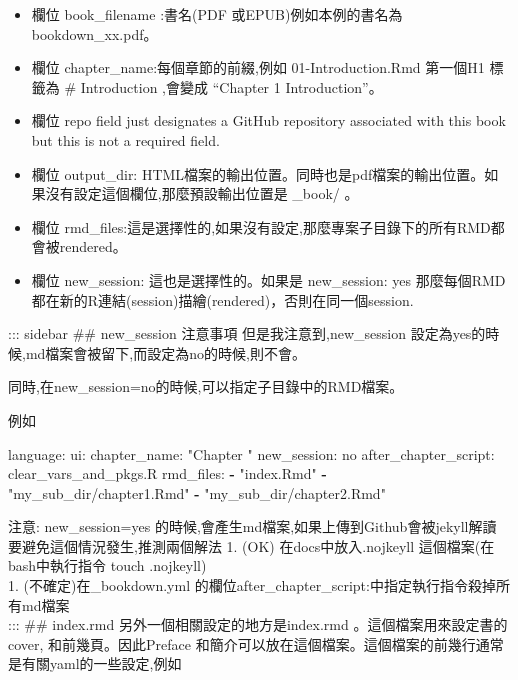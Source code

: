 \documentclass[]{book}
\newenvironment{Shaded}{\begin{snugshade}}{\end{snugshade}}
\newcommand{\KeywordTok}[1]{\textcolor[rgb]{0.13,0.29,0.53}{\textbf{#1}}}
\newcommand{\StringTok}[1]{\textcolor[rgb]{0.31,0.60,0.02}{#1}}
\newcommand{\FunctionTok}[1]{\textcolor[rgb]{0.00,0.00,0.00}{#1}}
\newcommand{\AttributeTok}[1]{\textcolor[rgb]{0.77,0.63,0.00}{#1}}
\providecommand{\tightlist}{%
  \setlength{\itemsep}{0pt}\setlength{\parskip}{0pt}}
\theoremstyle{definition}
\theoremstyle{definition}
\theoremstyle{definition}
\theoremstyle{remark}
\begin{document}
\begin{itemize}
\tightlist
\item
  欄位 book\_filename :書名(PDF
  或EPUB)例如本例的書名為bookdown\_xx.pdf。\\
\item
  欄位 chapter\_name:每個章節的前綴,例如 01-Introduction.Rmd 第一個H1
  標籤為 \# Introduction ,會變成 ``Chapter 1 Introduction''。\\
\item
  欄位 repo field just designates a GitHub repository associated with
  this book but this is not a required field.\\
\item
  欄位 output\_dir:
  HTML檔案的輸出位置。同時也是pdf檔案的輸出位置。如果沒有設定這個欄位,那麼預設輸出位置是
  \_book/ 。\\
\item
  欄位
  rmd\_files:這是選擇性的,如果沒有設定,那麼專案子目錄下的所有RMD都會被rendered。\\
\item
  欄位 new\_session: 這也是選擇性的。如果是 new\_session: yes
  那麼每個RMD都在新的R連結(session)描繪(rendered)，否則在同一個session.
\end{itemize}

::: sidebar \#\# new\_session 注意事項 但是我注意到,new\_session
設定為yes的時候,md檔案會被留下,而設定為no的時候,則不會。

同時,在new\_session=no的時候,可以指定子目錄中的RMD檔案。

例如

\begin{Shaded}
\begin{Highlighting}[]
\FunctionTok{language:}
  \FunctionTok{ui:}
    \FunctionTok{chapter_name:}\AttributeTok{ }\StringTok{"Chapter "}
\FunctionTok{new_session:}\AttributeTok{ no}
\FunctionTok{after_chapter_script:}\AttributeTok{ clear_vars_and_pkgs.R}
\FunctionTok{rmd_files:}
  \KeywordTok{-} \StringTok{"index.Rmd"}
  \KeywordTok{-} \StringTok{"my_sub_dir/chapter1.Rmd"}
  \KeywordTok{-} \StringTok{"my_sub_dir/chapter2.Rmd"}
\end{Highlighting}
\end{Shaded}

注意: new\_session=yes
的時候,會產生md檔案,如果上傳到Github會被jekyll解讀
要避免這個情況發生,推測兩個解法 1. (OK) 在docs中放入.nojkeyll
這個檔案(在bash中執行指令 touch .nojkeyll)\\
1. (不確定)在\_bookdown.yml
的欄位after\_chapter\_script:中指定執行指令殺掉所有md檔案\\
::: \#\# index.rmd 另外一個相關設定的地方是index.rmd
。這個檔案用來設定書的cover, 和前幾頁。因此Preface
和簡介可以放在這個檔案。這個檔案的前幾行通常是有關yaml的一些設定,例如
\end{document}
